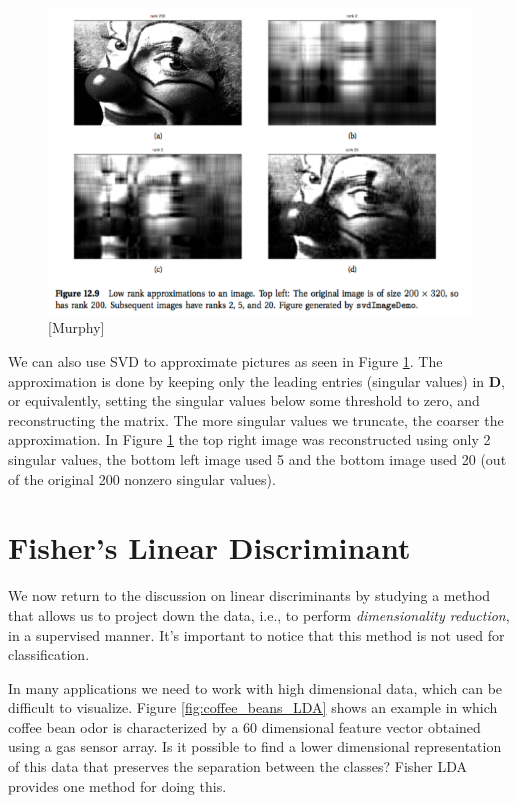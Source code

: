 \documentclass[a4paper]{article}
\begin{document}
\begin{figure}
\centering
\includegraphics[width=1.0\textwidth]{clown_SVD.png}
\caption{\label{fig:SVDClown}[Murphy]}
\end{figure}

We can also use SVD to approximate pictures as seen in Figure \ref{fig:SVDClown}. The approximation is done by keeping only the leading entries (singular values) in $\mathbf{D}$, or equivalently, setting the singular values below some threshold to zero, and reconstructing the matrix. The more singular values we truncate, the coarser the approximation. In Figure \ref{fig:SVDClown} the top right image was reconstructed using only 2 singular values, the bottom left image used 5 and the bottom image used 20 (out of the original 200 nonzero singular values).


\section{Fisher's Linear Discriminant}
We now return to the discussion on linear discriminants by studying a method that allows us to project down the data, i.e., to perform \emph{dimensionality reduction}, in a supervised manner. It's important to notice that this method is not used for classification.

In many  applications we need to work with high dimensional data, which can be difficult to visualize.  Figure \ref{fig:coffee_beans_LDA} shows an example in which coffee bean odor is characterized by a 60 dimensional feature vector obtained using a gas sensor array.  Is it possible to find a lower dimensional representation of this data that preserves the separation between the classes? Fisher LDA provides one method for doing this. 
\end{document}
